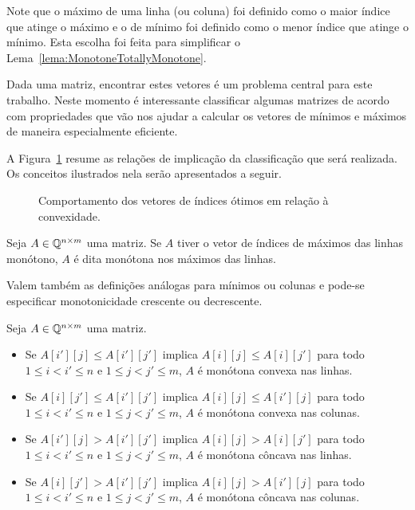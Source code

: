 Note que o máximo de uma linha (ou coluna) foi definido como o maior índice que atinge o máximo e o de mínimo foi definido como o menor índice que atinge o mínimo. Esta escolha foi feita para simplificar o Lema~\ref{lema:MonotoneTotallyMonotone}.  

Dada uma matriz, encontrar estes vetores é um problema central para este trabalho. Neste momento é interessante classificar algumas matrizes de acordo com propriedades que vão nos ajudar a calcular os vetores de mínimos e máximos de maneira especialmente eficiente.   

A Figura~\ref{figure:ConvexMonotone} resume as relações de implicação da classificação que será realizada. Os conceitos ilustrados nela serão apresentados a seguir.

\begin{figure}[t]
    \centering
    
    \caption{Comportamento dos vetores de índices ótimos em relação à convexidade.} \label{figure:ConvexMonotone}
\end{figure}

\begin{defi}
Seja $A \in \mathbb{Q}^{n \times m}$ uma matriz. Se $A$ tiver o vetor de índices de máximos das linhas monótono, $A$ é dita monótona nos máximos das linhas. 

Valem também as definições análogas para mínimos ou colunas e pode-se especificar monotonicidade crescente ou decrescente.
\end{defi}

\begin{defi}
Seja $A \in \mathbb{Q}^{n \times m}$ uma matriz.
    \begin{itemize}
        \item Se $A[i'][j] \leq A[i'][j']$ implica $A[i][j] \leq A[i][j']$ para todo $1 \leq i < i' \leq n$ e $1 \leq j < j' \leq m$, $A$ é monótona convexa nas linhas.
        \item Se $A[i][j'] \leq A[i'][j']$ implica $A[i][j] \leq A[i'][j]$ para todo $1 \leq i < i' \leq n$ e $1 \leq j < j' \leq m$, $A$ é monótona convexa nas colunas.
        \item Se $A[i'][j] > A[i'][j']$ implica $A[i][j] > A[i][j']$ para todo $1 \leq i < i' \leq n$ e $1 \leq j < j' \leq m$, $A$ é monótona côncava nas linhas.
        \item Se $A[i][j'] > A[i'][j']$ implica $A[i][j] > A[i'][j]$ para todo $1 \leq i < i' \leq n$ e $1 \leq j < j' \leq m$, $A$ é monótona côncava nas colunas.
    \end{itemize}
\end{defi}

